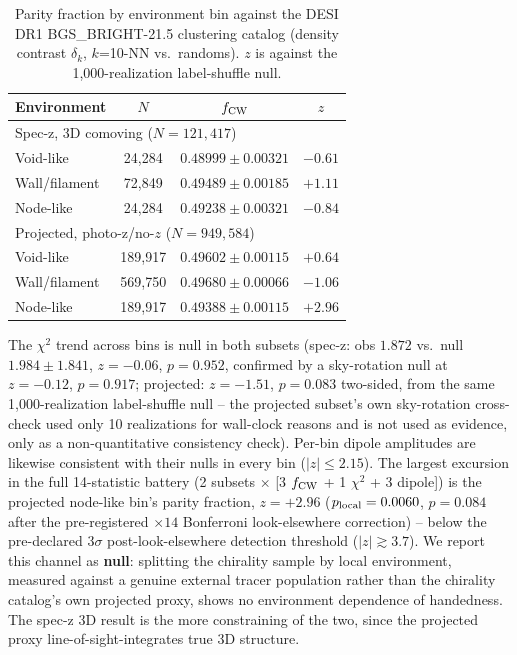 \documentclass[twocolumn,linenumbers]{aastex702}
\begin{document}
\begin{table}[t]
\centering
\caption{Parity fraction by environment bin against the DESI DR1
BGS\_BRIGHT-21.5 clustering catalog (density contrast $\delta_k$,
$k$=10-NN vs.\ randoms). $z$ is against the 1,000-realization
label-shuffle null.}
\label{tab:bgs_environment}
\begin{ruledtabular}
\begin{tabular}{lccc}
Environment & $N$ & $f_{\rm CW}$ & $z$ \\
\hline
\multicolumn{4}{l}{Spec-z, 3D comoving ($N=121{,}417$)} \\
Void-like & 24,284 & $0.48999\pm0.00321$ & $-0.61$ \\
Wall/filament & 72,849 & $0.49489\pm0.00185$ & $+1.11$ \\
Node-like & 24,284 & $0.49238\pm0.00321$ & $-0.84$ \\
\multicolumn{4}{l}{Projected, photo-z/no-$z$ ($N=949{,}584$)} \\
Void-like & 189,917 & $0.49602\pm0.00115$ & $+0.64$ \\
Wall/filament & 569,750 & $0.49680\pm0.00066$ & $-1.06$ \\
Node-like & 189,917 & $0.49388\pm0.00115$ & $+2.96$ \\
\end{tabular}
\end{ruledtabular}
\end{table}

The $\chi^2$ trend across bins is null in both subsets (spec-z: obs
$1.872$ vs.\ null $1.984\pm1.841$, $z=-0.06$, $p=0.952$, confirmed by a
sky-rotation null at $z=-0.12$, $p=0.917$; projected: $z=-1.51$,
$p=0.083$ two-sided, from the same 1,000-realization label-shuffle null --
the projected subset's own sky-rotation cross-check used only 10
realizations for wall-clock reasons and is not used as evidence, only as a
non-quantitative consistency check). Per-bin dipole amplitudes are
likewise consistent with their nulls in every bin ($|z|\le2.15$). The
largest excursion in the full 14-statistic battery (2 subsets $\times$ [3
$f_{\rm CW}$ + 1 $\chi^2$ + 3 dipole]) is the projected node-like bin's
parity fraction, $z=+2.96$ ($p_{\rm local}=0.0060$, $p=0.084$ after the
pre-registered $\times14$ Bonferroni look-elsewhere correction) -- below
the pre-declared $3\sigma$ post-look-elsewhere detection threshold
($|z|\gtrsim3.7$). We report this channel as \textbf{null}: splitting the
chirality sample by local environment, measured against a genuine
external tracer population rather than the chirality catalog's own
projected proxy, shows no environment dependence of handedness. The
spec-z 3D result is the more constraining of the two, since the
projected proxy line-of-sight-integrates true 3D structure.
\end{document}
